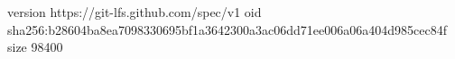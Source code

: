 version https://git-lfs.github.com/spec/v1
oid sha256:b28604ba8ea7098330695bf1a3642300a3ac06dd71ee006a06a404d985cec84f
size 98400
